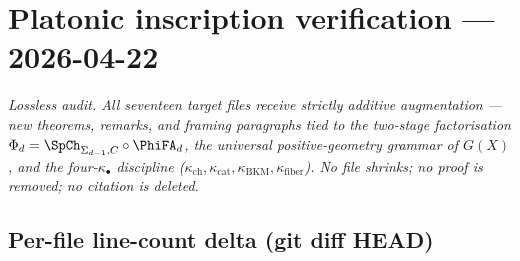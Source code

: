 
\providecommand{\kBKM}{\kappa_{\mathrm{BKM}}}
\providecommand{\kch}{\kappa_{\mathrm{ch}}}
\providecommand{\kcat}{\kappa_{\mathrm{cat}}}
\providecommand{\kfib}{\kappa_{\mathrm{fiber}}}

\section*{Platonic inscription verification --- 2026-04-22}
\label{wn:sec:platonic-inscription-verification-20260422}

\emph{Lossless audit. All seventeen target files receive strictly
additive augmentation --- new theorems, remarks, and framing paragraphs
tied to the two-stage factorisation $\Phi_d = \SpCh_{\Sigma_{d-1}, C}
\circ \PhiFA_d$, the universal positive-geometry grammar of $G(X)$,
and the four-$\kappa_\bullet$ discipline ($\kch, \kcat, \kBKM, \kfib$).
No file shrinks; no proof is removed; no citation is deleted.}

\subsection*{Per-file line-count delta (git diff HEAD)}

